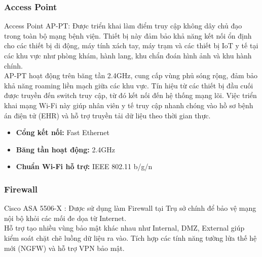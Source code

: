 \subsubsection{Access Point}
Access Point AP-PT: Được triển khai làm điểm truy cập không dây chủ đạo trong
toàn bộ mạng bệnh viện. Thiết bị này đảm bảo khả năng kết nối ổn định cho các thiết
bị di động, máy tính xách tay, máy trạm và các thiết bị IoT y tế tại các khu vực như
phòng khám, hành lang, khu chẩn đoán hình ảnh và khu hành chính.\\
\indent AP-PT hoạt động trên băng tần 2.4GHz, cung cấp vùng phủ sóng rộng, đảm bảo
khả năng roaming liền mạch giữa các khu vực. Tín hiệu từ các thiết bị đầu cuối được
truyền đến switch truy cập, từ đó kết nối đến hệ thống mạng lõi. Việc triển khai mạng
Wi-Fi này giúp nhân viên y tế truy cập nhanh chóng vào hồ sơ bệnh án điện tử (EHR)
và hỗ trợ truyền tải dữ liệu theo thời gian thực.
\begin{tcolorbox}[
    enhanced,
    colback=white,
    colframe=darkgray,
    coltitle=black,
    fonttitle=\large\bfseries,
    title=Thông số kỹ thuật Access Point AP-PT,
    attach boxed title to top left={xshift=5mm, yshift=-3mm},
    boxed title style={colback=white, colframe=darkgray},
    drop fuzzy shadow,
    top=4mm, bottom=2mm, left=2mm, right=2mm
]
    \begin{itemize}
        \item \textbf{Cổng kết nối:} Fast Ethernet
        \item \textbf{Băng tần hoạt động:} 2.4GHz
        \item \textbf{Chuẩn Wi-Fi hỗ trợ:} IEEE 802.11 b/g/n
    \end{itemize}
\end{tcolorbox}

\subsubsection{Firewall}
Cisco ASA 5506-X : Được sử dụng làm Firewall tại Trụ sở chính để bảo vệ mạng nội bộ khỏi các mối đe dọa từ Internet.\\
\indent Hỗ trợ tạo nhiều vùng bảo mật khác nhau như Internal, DMZ, External giúp kiểm soát chặt chẽ luồng dữ liệu ra vào. Tích hợp các tính năng tường lửa thế hệ mới (NGFW) và hỗ trợ VPN bảo mật.

